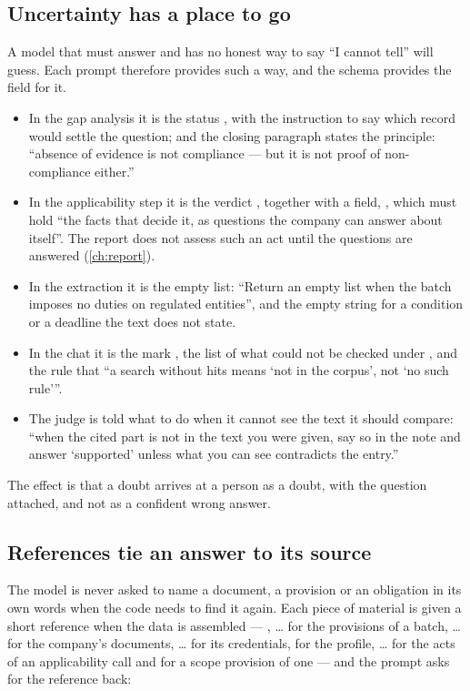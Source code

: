 \subsection{Uncertainty has a place to go}

A model that must answer and has no honest way to say \enquote{I cannot tell} will guess. Each
prompt therefore provides such a way, and the schema provides the field for it.

\begin{itemize}
  \item In the gap analysis it is the status , with the instruction to say
    which record would settle the question; and the closing paragraph states the principle:
    \enquote{absence of evidence is not compliance — but it is not proof of non-compliance
    either.}
  \item In the applicability step it is the verdict , together with a field,
    , which must hold \enquote{the facts that decide it, as questions
    the company can answer about itself}. The report does not assess such an act until the
    questions are answered (\cref{ch:report}).
  \item In the extraction it is the empty list: \enquote{Return an empty list when the batch
    imposes no duties on regulated entities}, and the empty string for a condition or a
    deadline the text does not state.
  \item In the chat it is the mark , the list of what could not be checked
    under , and the rule that \enquote{a search without hits means \enquote{not in
    the corpus}, not \enquote{no such rule}}.
  \item The judge is told what to do when it cannot see the text it should compare:
    \enquote{when the cited part is not in the text you were given, say so in the note and
    answer \enquote{supported} unless what you can see contradicts the entry.}
\end{itemize}

The effect is that a doubt arrives at a person as a doubt, with the question attached, and not
as a confident wrong answer.

\subsection{References tie an answer to its source}

The model is never asked to name a document, a provision or an obligation in its own words
when the code needs to find it again. Each piece of material is given a short reference when
the data is assembled — ,  … for the provisions of a batch,  … for
the company's documents,  … for its credentials,  for the profile,
 … for the acts of an applicability call and  for a scope provision of
one — and the prompt asks for the reference back:

